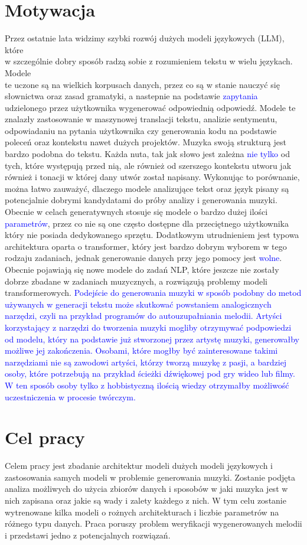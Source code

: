 \documentclass[data-science]{agh-wi} %
\begin{document}
\section{Motywacja}
Przez ostatnie lata widzimy szybki rozwój dużych modeli językowych (LLM), które\\ w szczególnie dobry sposób radzą sobie z rozumieniem tekstu w wielu językach. Modele\\ te uczone są na wielkich korpusach danych, przez co są w stanie nauczyć się słownictwa oraz zasad gramatyki, a nastepnie na podstawie \textcolor{blue}{zapytania} udzielonego przez użytkownika wygenerować odpowiednią odpowiedź. Modele te znalazły zastosowanie w maszynowej translacji tekstu, analizie sentymentu, odpowiadaniu na pytania użytkownika czy generowania kodu na podstawie poleceń oraz kontekstu nawet dużych projektów. Muzyka swoją strukturą jest bardzo podobna do tekstu. Każda nuta, tak jak słowo jest zależna \textcolor{blue}{nie tylko} od tych, które występują przed nią, ale również od szerszego kontekstu utworu jak również i tonacji w której dany utwór został napisany. Wykonując to porównanie, można łatwo zauważyć, dlaczego modele analizujące tekst oraz język pisany są potencjalnie dobrymi kandydatami do próby analizy i generowania muzyki. Obecnie w celach generatywnych stosuje się modele o bardzo dużej ilości \textcolor{blue}{parametrów}, przez co nie są one często dostępne dla przeciętnego użytkownika który nie posiada dedykowanego sprzętu. Dodatkowym utrudnieniem jest typowa architektura oparta o transformer, który jest bardzo dobrym wyborem w tego rodzaju zadaniach, jednak generowanie danych przy jego pomocy jest \textcolor{blue}{wolne}. Obecnie pojawiają się nowe modele do zadań NLP, które jeszcze nie zostały dobrze zbadane w zadaniach muzycznych, a rozwiązują problemy modeli transformerowych. \textcolor{blue}{Podejście do generowania muzyki w sposób podobny do metod używanych w generacji tekstu może skutkować powstaniem analogicznych narzędzi, czyli na przykład programów do autouzupałniania melodii. Artyści korzystający z narzędzi do tworzenia muzyki mogliby otrzymywać podpowiedzi od modelu, który na podstawie już stworzonej przez artystę muzyki, generowałby możliwe jej zakończenia. Osobami, które mogłby być zainteresowane takimi narzędziami nie są zawodowi artyści, którzy tworzą muzykę z pasji, a bardziej osoby, które potrzebują na przykład ścieżki dźwiękowej pod gry wideo lub filmy. W ten sposób osoby tylko z hobbistyczną ilością wiedzy otrzymałby możliwość uczestniczenia w procesie twórczym.}
\section{Cel pracy}
Celem pracy jest zbadanie architektur modeli dużych modeli językowych i zastosowania samych modeli w problemie generowania muzyki. Zostanie podjęta analiza możliwych do użycia zbiorów danych i sposobów w jaki muzyka jest w nich zapisana oraz jakie są wady i zalety każdego z nich. W tym celu zostanie wytrenowane kilka modeli o rożnych architekturach i liczbie parametrów na różnego typu danych. Praca poruszy problem weryfikacji wygenerowanych melodii i przedstawi jedno z potencjalnych rozwiązań.
\end{document}
